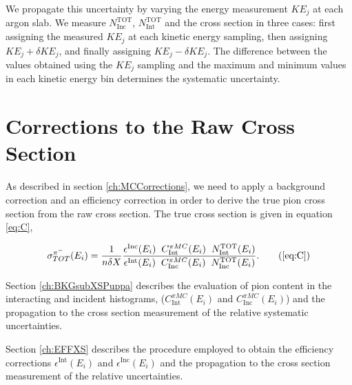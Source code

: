 We propagate this uncertainty  by varying the energy measurement $KE_{j}$ at each argon slab. We measure $N^{\text{TOT}}_{\text{Inc}}$,  $N^{\text{TOT}}_{\text{Int}}$ and the cross section  in three cases: first assigning the measured $KE_{j}$ at each kinetic energy sampling, then assigning $KE_{j} + \delta KE_{j}$, and finally assigning $KE_{j} - \delta KE_{j}$. The difference between the values obtained using the $KE_{j}$ sampling and the maximum and minimum values in each kinetic energy bin determines the systematic uncertainty.


\section{Corrections to the Raw Cross Section}\label{ch:PionXSCorrections}
As described in section \ref{ch:MCCorrections}, we need to apply a background correction and an efficiency correction in order to derive the true pion cross section from the raw cross section.  The true cross section is given in equation \ref{eq:C}, 

\begin{equation}
   \sigma^{\pi^-}_{TOT}(E_{i})  = \frac{1}{n \delta X}\frac{ \epsilon^{\text{Inc}}(E_i)  \hspace{0.2cm} C^{\pi MC}_{\text{Int}} (E_{i}) \hspace{0.2cm} N^{\text{TOT}}_{\text{Int}} (E_{i}) }{   \epsilon^{\text{Int}}(E_i) \hspace{0.2cm} C^{\pi MC}_{\text{Inc}} (E_{i}) \hspace{0.2cm}  N^{\text{TOT}}_{\text{Inc}} (E_{i})}.
 \tag{\ref{eq:C}}
\end{equation}

Section \ref{ch:BKGsubXSPuppa} describes the evaluation of pion content in the interacting and incident histograms, ($C^{\pi MC}_{\text{Int}} (E_{i})$  and  $C^{\pi MC}_{\text{Inc}} (E_{i})$) and the propagation to the cross section measurement of the relative systematic uncertainties.

Section \ref{ch:EFFXS} describes the procedure employed to obtain  the efficiency corrections $\epsilon^{\text{Int}}(E_i)$  and $\epsilon^{\text{Inc}}(E_i)$ and the propagation to the cross section measurement of the relative uncertainties.


